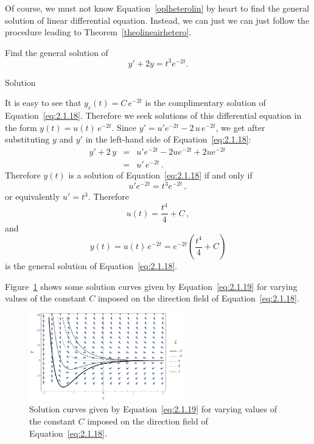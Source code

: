 Of course, we must not know Equation~\eqref{oplheterolin} by heart to find the general solution of linear differential equation. Instead, we can just we can just follow the procedure leading to Theorem~\ref{theolineairhetero}.

\begin{example}\label{example:2.1.5}
Find the general solution of
\begin{equation}\label{eq:2.1.18}
y'+2y=t^3e^{-2t}.
\end{equation}

Solution 

It is easy to see that $y_c(t)=C\,e^{-2t}$ is the complimentary solution of Equation~\eqref{eq:2.1.18}. Therefore we seek solutions of this differential equation in the form  $y(t)=u(t)\,e^{-2t}$. Since $y'=u'e^{-2t}-2\,u\,e^{-2t}$, we get after substituting $y$ and $y'$ in the left-hand side of Equation~\eqref{eq:2.1.18}:
\begin{eqnarray*}
y'+2\,y&=&u'e^{-2t}-2ue^{-2t}+2ue^{-2t}\,\\
&=&u'\,e^{-2t}\,.
\end{eqnarray*}
Therefore $y(t)$ is a solution of Equation~\eqref{eq:2.1.18} if and only if
$$
u'e^{-2t}=t^3e^{-2t} \,,
$$
or equivalently $u'=t^3$. Therefore
$$
u(t)=\dfrac{t^4}{4}+C\,,
$$
and
\begin{equation}
y(t)=u(t)\,e^{-2t}=e^{-2t}\left(\dfrac{t^4}{4}+C\right)
\label{eq:2.1.19}
\end{equation}
is the general  solution of Equation~\eqref{eq:2.1.18}.

Figure~\ref{etheterolin} shows some solution curves given by Equation~\eqref{eq:2.1.19} for varying values of the constant $C$ imposed on the direction field of Equation~\eqref{eq:2.1.18}. 

\begin{figure}[H]
	\begin{center}
			\includegraphics[width=0.6\textwidth]{exheterolin}
	\caption{Solution curves given by Equation~\eqref{eq:2.1.19} for varying values of the constant $C$ imposed on the direction field of Equation~\eqref{eq:2.1.18}.}
	\label{etheterolin}
	\end{center}
\end{figure}


\end{example}

